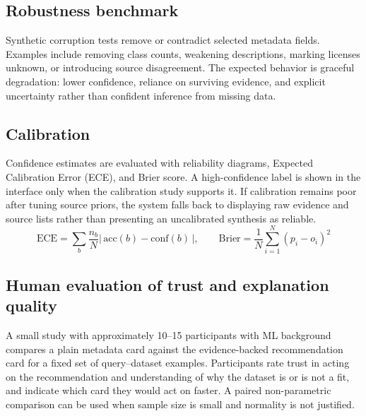 \documentclass[11pt]{article}
\begin{document}
\subsection{Robustness benchmark}
Synthetic corruption tests remove or contradict selected metadata fields. Examples include removing class
counts, weakening descriptions, marking licenses unknown, or introducing source disagreement. The expected
behavior is graceful degradation: lower confidence, reliance on surviving evidence, and explicit
uncertainty rather than confident inference from missing data.

\subsection{Calibration}
\label{sec:calibration}
Confidence estimates are evaluated with reliability diagrams, Expected Calibration Error (ECE), and Brier
score. A high-confidence label is shown in the interface only when the calibration study supports it. If
calibration remains poor after tuning source priors, the system falls back to displaying raw evidence and
source lists rather than presenting an uncalibrated synthesis as reliable.
\begin{equation}
\mathrm{ECE} = \sum_{b} \frac{n_b}{N} \left|\, \mathrm{acc}(b) - \mathrm{conf}(b) \,\right|,
\qquad
\mathrm{Brier} = \frac{1}{N}\sum_{i=1}^{N} (p_i - o_i)^2
\end{equation}

\subsection{Human evaluation of trust and explanation quality}
\label{sec:human-eval}
A small study with approximately 10--15 participants with ML background compares a plain metadata card
against the evidence-backed recommendation card for a fixed set of query--dataset examples. Participants
rate trust in acting on the recommendation and understanding of why the dataset is or is not a fit, and
indicate which card they would act on faster. A paired non-parametric comparison can be used when sample
size is small and normality is not justified.
\end{document}
